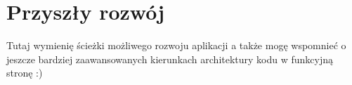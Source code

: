 \documentclass[../main.tex]{subfiles}
\begin{document}
\section{Przyszły rozwój}
Tutaj wymienię ścieżki możliwego rozwoju aplikacji a także mogę wspomnieć o jeszcze bardziej zaawansowanych kierunkach architektury kodu w funkcyjną stronę :)
\end{document}
